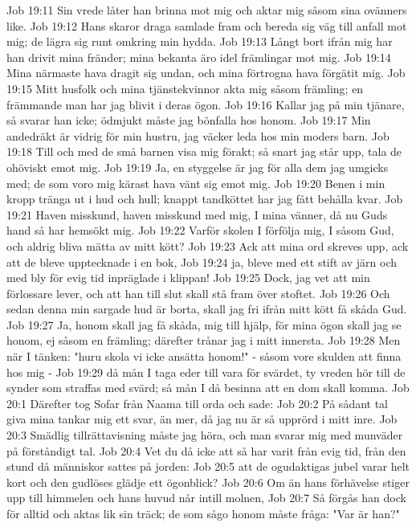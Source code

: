 Job 19:11  Sin vrede låter han brinna mot mig och aktar mig såsom sina ovänners like.
Job 19:12  Hans skaror draga samlade fram och bereda sig väg till anfall mot mig; de lägra sig runt omkring min hydda.
Job 19:13  Långt bort ifrån mig har han drivit mina fränder; mina bekanta äro idel främlingar mot mig.
Job 19:14  Mina närmaste hava dragit sig undan, och mina förtrogna hava förgätit mig.
Job 19:15  Mitt husfolk och mina tjänstekvinnor akta mig såsom främling; en främmande man har jag blivit i deras ögon.
Job 19:16  Kallar jag på min tjänare, så svarar han icke; ödmjukt måste jag bönfalla hos honom.
Job 19:17  Min andedräkt är vidrig för min hustru, jag väcker leda hos min moders barn.
Job 19:18  Till och med de små barnen visa mig förakt; så snart jag står upp, tala de ohöviskt emot mig.
Job 19:19  Ja, en styggelse är jag för alla dem jag umgicks med; de som voro mig kärast hava vänt sig emot mig.
Job 19:20  Benen i min kropp tränga ut i hud och hull; knappt tandköttet har jag fått behålla kvar.
Job 19:21  Haven misskund, haven misskund med mig, I mina vänner, då nu Guds hand så har hemsökt mig.
Job 19:22  Varför skolen I förfölja mig, I såsom Gud, och aldrig bliva mätta av mitt kött?
Job 19:23  Ack att mina ord skreves upp, ack att de bleve upptecknade i en bok,
Job 19:24  ja, bleve med ett stift av järn och med bly för evig tid inpräglade i klippan!
Job 19:25  Dock, jag vet att min förlossare lever, och att han till slut skall stå fram över stoftet.
Job 19:26  Och sedan denna min sargade hud är borta, skall jag fri ifrån mitt kött få skåda Gud.
Job 19:27  Ja, honom skall jag få skåda, mig till hjälp, för mina ögon skall jag se honom, ej såsom en främling; därefter trånar jag i mitt innersta.
Job 19:28  Men när I tänken: "huru skola vi icke ansätta honom!" - såsom vore skulden att finna hos mig -
Job 19:29  då mån I taga eder till vara för svärdet, ty vreden hör till de synder som straffas med svärd; så mån I då besinna att en dom skall komma.
Job 20:1  Därefter tog Sofar från Naama till orda och sade:
Job 20:2  På sådant tal giva mina tankar mig ett svar, än mer, då jag nu är så upprörd i mitt inre.
Job 20:3  Smädlig tillrättavisning måste jag höra, och man svarar mig med munväder på förståndigt tal.
Job 20:4  Vet du då icke att så har varit från evig tid, från den stund då människor sattes på jorden:
Job 20:5  att de ogudaktigas jubel varar helt kort och den gudlöses glädje ett ögonblick?
Job 20:6  Om än hans förhävelse stiger upp till himmelen och hans huvud når intill molnen,
Job 20:7  Så förgås han dock för alltid och aktas lik sin träck; de som sågo honom måste fråga: "Var är han?"
